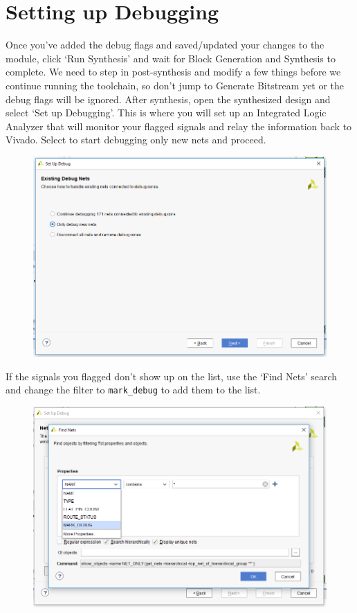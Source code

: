 \documentclass{article}
\begin{document}
\section{Setting up Debugging}
Once you've added the debug flags and saved/updated your changes to
the module, click `Run Synthesis' and wait for Block Generation and
Synthesis to complete.  We need to step in post-synthesis and modify a
few things before we continue running the toolchain, so don't jump to
Generate Bitstream yet or the debug flags will be ignored.  After
synthesis, open the synthesized design and select `Set up Debugging'.
This is where you will set up an Integrated Logic Analyzer that will
monitor your flagged signals and relay the information back to Vivado.
Select to start debugging only new nets and proceed.
\begin{figure} [h!]
  \centering
  \includegraphics[scale=0.35]{figures/figure1.png}
\end{figure}	
	
If the signals you flagged don't show up on the list, use the `Find
Nets' search and change the filter to \verb|mark_debug| to add them to
the list.	
\begin{figure} [h!]
  \centering
  \includegraphics[scale=0.35]{figures/figure2.png}
\end{figure}	
	
\end{document}
